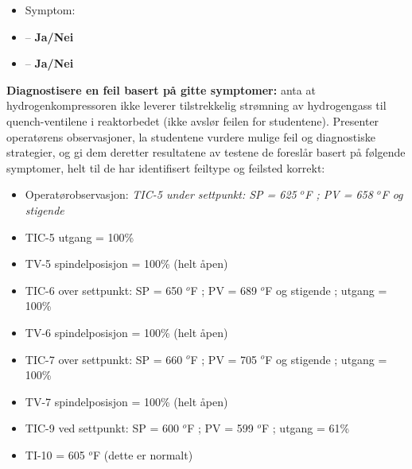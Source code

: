 \begin{itemize}
\item{} Symptom: {\it }
\item{}  -- {\bf Ja/Nei}
\item{}  -- {\bf Ja/Nei}
\end{itemize}


\vskip 10pt


\noindent
{\bf Diagnostisere en feil basert på gitte symptomer:} anta at hydrogenkompressoren ikke leverer tilstrekkelig strømning av hydrogengass til quench-ventilene i reaktorbedet (ikke avslør feilen for studentene). Presenter operatørens observasjoner, la studentene vurdere mulige feil og diagnostiske strategier, og gi dem deretter resultatene av testene de foreslår basert på følgende symptomer, helt til de har identifisert feiltype og feilsted korrekt:

\begin{itemize}
\item{} Operatørobservasjon: {\it TIC-5 under settpunkt: SP = 625 $^{o}$F ; PV = 658 $^{o}$F og stigende}
\item{} TIC-5 utgang = 100\%
\item{} TV-5 spindelposisjon = 100\% (helt åpen)
\item{} TIC-6 over settpunkt: SP = 650 $^{o}$F ; PV = 689 $^{o}$F og stigende ; utgang = 100\%
\item{} TV-6 spindelposisjon = 100\% (helt åpen)
\item{} TIC-7 over settpunkt: SP = 660 $^{o}$F ; PV = 705 $^{o}$F og stigende ; utgang = 100\%
\item{} TV-7 spindelposisjon = 100\% (helt åpen)
\item{} TIC-9 ved settpunkt: SP = 600 $^{o}$F ; PV = 599 $^{o}$F ; utgang = 61\%
\item{} TI-10 = 605 $^{o}$F (dette er normalt)
\end{itemize}


